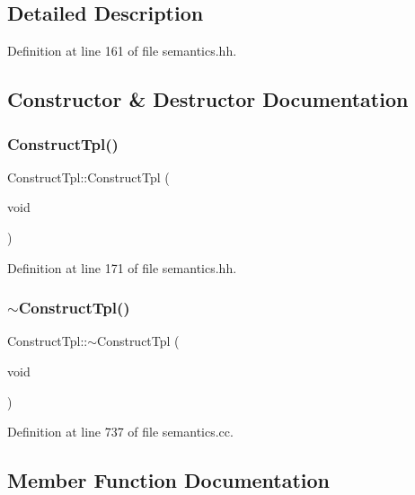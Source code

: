\subsection{Detailed Description}


Definition at line 161 of file semantics.\+hh.



\subsection{Constructor \& Destructor Documentation}
\mbox{\label{class_construct_tpl_ac48c40e9b9528d5116efd5a5ce4dd0a7}} 
\subsubsection{\texorpdfstring{ConstructTpl()}{ConstructTpl()}}
{\footnotesize\ttfamily Construct\+Tpl\+::\+Construct\+Tpl (\begin{DoxyParamCaption}\item[{void}]{ }\end{DoxyParamCaption})\hspace{0.3cm}{\ttfamily [inline]}}



Definition at line 171 of file semantics.\+hh.

\mbox{\label{class_construct_tpl_ab0140ce80792d6d6a4544d9395ab3d9d}} 
\subsubsection{\texorpdfstring{$\sim$ConstructTpl()}{~ConstructTpl()}}
{\footnotesize\ttfamily Construct\+Tpl\+::$\sim$\+Construct\+Tpl (\begin{DoxyParamCaption}\item[{void}]{ }\end{DoxyParamCaption})}



Definition at line 737 of file semantics.\+cc.



\subsection{Member Function Documentation}
\mbox{\label{class_construct_tpl_a7a29a748cbd83165ae89751a7f2b7814}} 
